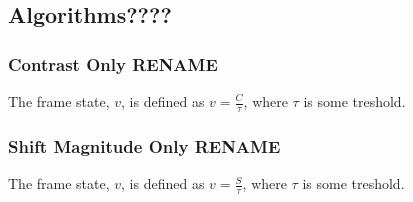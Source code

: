\subsection{Algorithms????}
%
\subsubsection{Contrast Only RENAME}
%
The frame state, $v$, is defined as $v=\frac{C}{\tau}$, %
%
where $\tau$ is some treshold.
%
\subsubsection{Shift Magnitude Only RENAME}
%
The frame state, $v$, is defined as $v=\frac{S}{\tau}$, %
%
where $\tau$ is some treshold.
%
